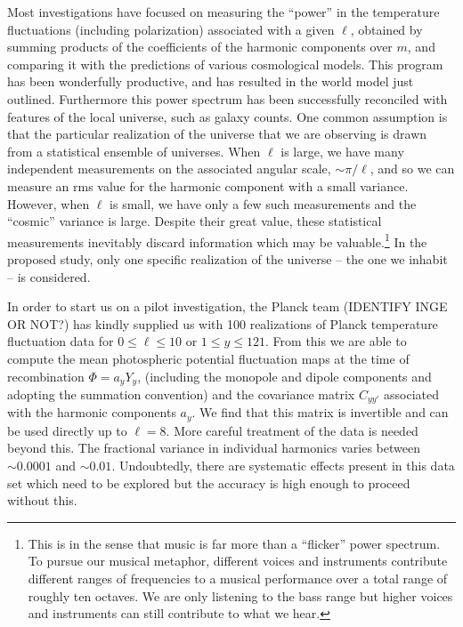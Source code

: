 \documentclass[psfig,11pt]{article}
\begin{document}
Most investigations have focused on measuring the ``power'' in the temperature fluctuations (including polarization) associated with a given $\ell$, obtained by summing products of the coefficients of the harmonic components over $m$, and comparing it with the predictions of various cosmological models. This program has been wonderfully productive, and has resulted in the world model just outlined. Furthermore this power spectrum has been successfully reconciled with features of the local universe, such as galaxy counts. One common assumption is that the particular realization of the universe that we are observing is drawn from a statistical ensemble of universes. When $\ell$ is large, we have many independent measurements on the associated angular scale, $\sim\pi/\ell$, and so we can measure an rms value for the harmonic component with a small variance. However, when $\ell$ is small, we have only a few such measurements and the ``cosmic'' variance is large. Despite their great value, these statistical measurements inevitably discard information which may be valuable.\footnote{This is in the sense that music is far more than a ``flicker'' power spectrum. To pursue our musical metaphor, different voices and instruments contribute different ranges of frequencies to a musical performance over a total range of roughly ten octaves. We are only listening to the bass range but higher voices and instruments can still contribute to what we hear.}  In the proposed study, only one specific realization of the universe -- the one we inhabit --  is considered.

In order to start us on a pilot investigation, the Planck team (IDENTIFY INGE OR NOT?) has kindly supplied us with 100 realizations of Planck temperature fluctuation data for $0\le\ell\le10$ or $1\le y\le121$. From this we are able to compute the mean photospheric potential fluctuation maps at the time of recombination $\Phi=a_yY_y$, (including the monopole and dipole components and adopting the summation convention) and the covariance matrix $C_{yy'}$ associated with the harmonic components $a_y$. We find that this matrix is invertible and can be used directly up to $\ell=8$. More careful treatment of the data is needed beyond this. The fractional variance in individual harmonics varies between $\sim0.0001$ and $\sim0.01$. Undoubtedly, there are systematic effects present in this data set which need to be explored but the accuracy is high enough to proceed without this.
\end{document}
